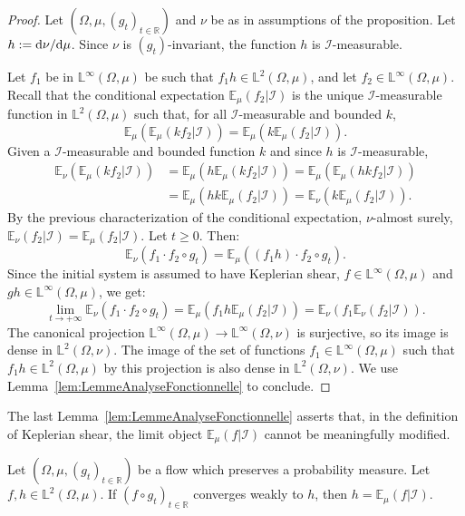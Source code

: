 \documentclass[AHL,Unicode,longabstracts]{cedram}
\newcommand{\R}{\mathbb{R}}
\newcommand{\Ebb}{\mathbb{E}}
\newcommand{\Lbb}{\mathbb{L}}
\newcommand{\Ical}{\mathcal{I}}
\newcommand{\de}{{\rm d}}
\begin{document}
\begin{proof}
Let $(\Omega, \mu, (g_t)_{t \in \R})$ and $\nu$ be as in assumptions of the proposition. Let $h := \de \nu / \de \mu$. Since $\nu$ is $(g_t)$-invariant, the function $h$ is $\Ical$-measurable.


Let $f_1$ be in $\Lbb^\infty (\Omega, \mu)$ be such that $f_1h \in \Lbb^2 (\Omega, \mu)$, and let $f_2 \in \Lbb^\infty (\Omega, \mu)$. Recall that the conditional expectation $\Ebb_\mu (f_2 | \Ical)$ is the unique $\Ical$-measurable function in $\Lbb^2 (\Omega, \mu)$ such that, for all $\Ical$-measurable and bounded $k$,
\[
\Ebb_\mu (\Ebb_\mu(k f_2 | \Ical)) = \Ebb_\mu (k \Ebb_\mu(f_2 | \Ical)).
\]
Given a $\Ical$-measurable and bounded function $k$ and since $h$ is $\Ical$-measurable,
\begin{align*}
\Ebb_\nu (\Ebb_\mu(k f_2 | \Ical)) & = \Ebb_\mu (h \Ebb_\mu(k f_2 | \Ical)) = \Ebb_\mu (\Ebb_\mu(hk f_2 | \Ical)) \\
& = \Ebb_\mu (hk \Ebb_\mu(f_2 | \Ical)) = \Ebb_\nu (k \Ebb_\mu(f_2 | \Ical)).
\end{align*}
By the previous characterization of the conditional expectation, $\nu$-almost surely, $\Ebb_\nu(f_2 | \Ical) = \Ebb_\mu(f_2 | \Ical)$. Let $t \geq 0$. Then:
\[
\Ebb_\nu (f_1 \cdot f_2 \circ g_t) = \Ebb_\mu ((f_1h) \cdot f_2\circ g_t).
\]
Since the initial system is assumed to have Keplerian shear, $f \in \Lbb^\infty (\Omega, \mu)$ and $gh \in \Lbb^\infty (\Omega, \mu)$, we get:
\[
\lim_{t \to + \infty} \Ebb_\nu (f_1 \cdot f_2 \circ g_t) = \Ebb_\mu (f_1h\Ebb_\mu (f_2 | \Ical)) = \Ebb_\nu (f_1 \Ebb_\nu (f_2 | \Ical)).
\]
The canonical projection $\Lbb^\infty (\Omega, \mu) \to \Lbb^\infty (\Omega, \nu)$ is surjective, so its image is dense in $\Lbb^2 (\Omega, \nu)$. The image of the set of functions $f_1 \in \Lbb^\infty (\Omega, \mu)$ such that $f_1h \in \Lbb^2 (\Omega, \mu)$ by this projection is also dense in $\Lbb^2 (\Omega, \nu)$. We use Lemma~\ref{lem:LemmeAnalyseFonctionnelle} to conclude.
\end{proof}


The last Lemma~\ref{lem:LemmeAnalyseFonctionnelle} asserts that, in the definition of Keplerian shear, the limit object $\Ebb_\mu (f | \Ical)$ cannot be meaningfully modified.


\begin{prop}
Let $(\Omega, \mu, (g_t)_{t \in \R})$ be a flow which preserves a probability measure. Let $f, h \in \Lbb^2 (\Omega, \mu)$.
If $(f \circ g_t)_{t \in \R}$ converges weakly to $h$, then $h = \Ebb_\mu (f | \Ical)$.
\end{prop}
\end{document}
